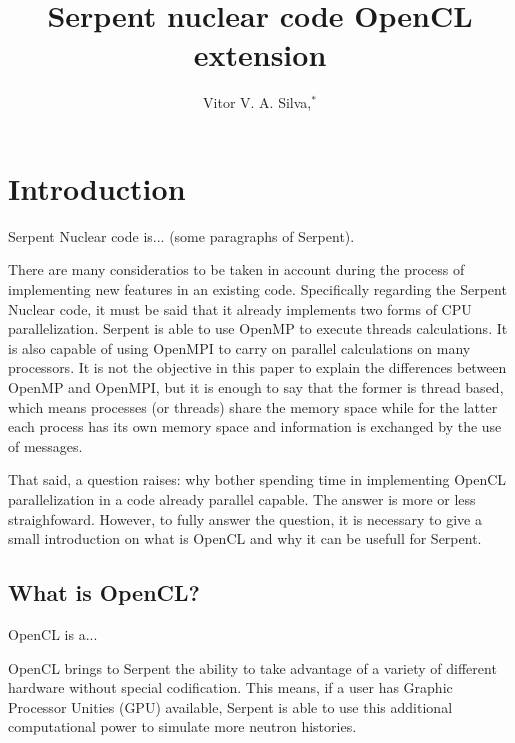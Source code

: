 \documentclass[twoside,a4paper,12pt,english,draft]{anstrans}
\title{Serpent nuclear code OpenCL extension}
\author{Vitor V. A. Silva,$^{*}$}
\institute{
$^{*}$Centro de Desenvolvimento da Tecnologia Nuclear, CEP: 30......
Belo Horizonte - MG, Brazil
}
\begin{document}
\vspace*{-42pt}
\begin{strip}
\vspace*{14pt}
\end{strip}


\section{Introduction}

Serpent Nuclear code is... (some paragraphs of Serpent).

There are many consideratios to be taken in account during the process of implementing new
features in an existing code. Specifically regarding the Serpent Nuclear code, it must be
said that it already implements two forms of CPU parallelization. Serpent is able to use
OpenMP\cite{omp} to execute threads calculations. It is also capable of using OpenMPI\cite{openmpi}
to carry on parallel calculations on many processors. It is not the objective in this paper
to explain the differences between OpenMP and OpenMPI, but it is enough to say that the former
is thread based, which means processes (or threads) share the memory space while for the latter
each process has its own memory space and information is exchanged by the use of messages.

That said, a question raises: why bother spending time in implementing OpenCL parallelization
in a code already parallel capable. The answer is more or less straighfoward. However, to fully
answer the question, it is necessary to give a small introduction on what is OpenCL and why
it can be usefull for Serpent.

\subsection{What is OpenCL?}

OpenCL\cite{opencl} is a...

OpenCL brings to Serpent the ability to take advantage of a variety of different hardware
without special codification. This means, if a user has Graphic Processor Unities (GPU)
available, Serpent is able to use this additional computational power to simulate
more neutron histories.

\end{document}
